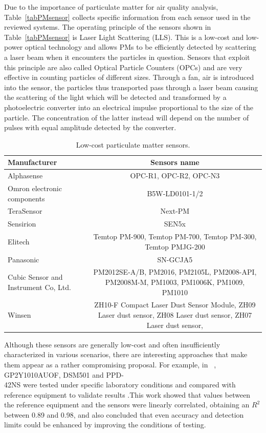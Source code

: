 \documentclass[10pt]{../imeko_acta}
\begin{document}
Due to the importance of particulate matter for air quality analysis, Table~\ref{tabPMsensor} collects specific information from each sensor used in the reviewed systems. 
The operating principle of the sensors shown in Table~\ref{tabPMsensor} is Laser Light Scattering (LLS). This is a low-cost and low-power optical technology and allows PMs to be efficiently detected by scattering a laser beam when it encounters the particles in question. Sensors that exploit this principle are also called Optical Particle Counters (OPCs) and are very effective in counting particles of different sizes. Through a fan, air is introduced into the sensor, the particles thus transported pass through a laser beam causing the scattering of the light which will be detected and transformed by a photoelectric converter into an electrical impulse proportional to the size of the particle. The concentration of the latter instead will depend on the number of pulses with equal amplitude detected by the converter.

\begin{table}[]
	\caption{Low-cost particulate matter sensors.}
	\label{tabLCPMs}
	\centering
	\begin{tabularx}{\columnwidth}{lC}
		\toprule
		Manufacturer\therownum	& Sensors name\\
		\midrule	
		Alphasense      &   OPC-R1, OPC-R2, OPC-N3\\
		Omron electronic components &  B5W-LD0101-1/2      \\
		TeraSensor & Next-PM \\
		Sensirion & SEN5x \\
		Elitech & Temtop PM-900, Temtop PM-700, Temtop PM-300, Temtop PMJG-200 \\
		Panasonic & SN-GCJA5 \\
		Cubic Sensor and Instrument Co, Ltd.    &  PM2012SE-A/B, PM2016, PM2105L, PM2008-API, PM2008M-M, PM1003, PM1006K, PM1009, PM1010 \\
		Winsen &  ZH10-F Compact Laser Dust Sensor Module, ZH09 Laser dust sensor, ZH08 Laser dust sensor, ZH07 Laser dust sensor, \\
		\bottomrule
	\end{tabularx}
\end{table}

Although these sensors are generally low-cost and often insufficiently characterized in various scenarios, there are interesting approaches that make them appear as a rather compromising proposal. For example, in ~\cite{wang2015laboratory}, GP2Y1010AUOF, DSM501 and  PPD-\\42NS were tested under specific laboratory conditions and compared with reference equipment to validate results .This work showed that values between the reference equipment and the sensors were linearly correlated, obtaining an $R^2$ between 0.89 and 0.98, and also concluded that even accuracy and detection limits could be enhanced by improving the conditions of testing. 
\end{document}
